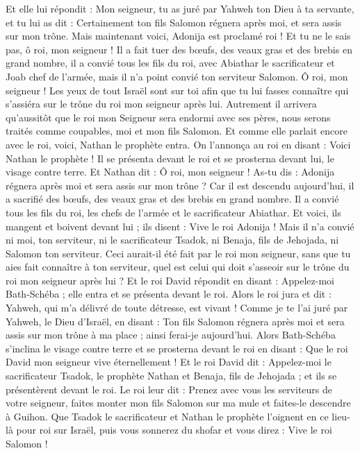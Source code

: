 \begin{multicols}{2}
Et elle lui répondit : Mon seigneur, tu as juré par Yahweh ton Dieu à ta servante, et tu lui as dit : Certainement ton fils Salomon régnera après moi, et sera assis sur mon trône. 
Mais maintenant voici, Adonija est proclamé roi ! Et tu ne le sais pas, ô roi, mon seigneur !
Il a fait tuer des bœufs, des veaux gras et des brebis en grand nombre, il a convié tous les fils du roi, avec Abiathar le sacrificateur et Joab chef de l'armée, mais il n'a point convié ton serviteur Salomon.
Ô roi, mon seigneur ! Les yeux de tout Israël sont sur toi afin que tu lui fasses connaître qui s'assiéra sur le trône du roi mon seigneur après lui.
Autrement il arrivera qu'aussitôt que le roi mon Seigneur sera endormi avec ses pères, nous serons traités comme coupables, moi et mon fils Salomon. 
Et comme elle parlait encore avec le roi, voici, Nathan le prophète entra.
On l'annonça au roi en disant : Voici Nathan le prophète ! Il se présenta devant le roi et se prosterna devant lui, le visage contre terre.
Et Nathan dit : Ô roi, mon seigneur ! As-tu dis : Adonija régnera après moi et sera assis sur mon trône ?
Car il est descendu aujourd'hui, il a sacrifié des bœufs, des veaux gras et des brebis en grand nombre. Il a convié tous les fils du roi, les chefs de l'armée et le sacrificateur Abiathar. Et voici, ils mangent et boivent devant lui ; ils disent : Vive le roi Adonija !
Mais il n'a convié ni moi, ton serviteur, ni le sacrificateur Tsadok, ni Benaja, fils de Jehojada, ni Salomon ton serviteur.
Ceci aurait-il été fait par le roi mon seigneur, sans que tu aies fait connaître à ton serviteur, quel est celui qui doit s'asseoir sur le trône du roi mon seigneur après lui ?
Et le roi David répondit en disant : Appelez-moi Bath-Schéba ; elle entra et se présenta devant le roi.
Alors le roi jura et dit : Yahweh, qui m'a délivré de toute détresse, est vivant !
Comme je te l'ai juré par Yahweh, le Dieu d'Israël, en disant : Ton fils Salomon régnera après moi et sera assis sur mon trône à ma place ; ainsi ferai-je aujourd'hui.
Alors Bath-Schéba s'inclina le visage contre terre et se prosterna devant le roi en disant : Que le roi David mon seigneur vive éternellement !
Et le roi David dit : Appelez-moi le sacrificateur Tsadok, le prophète Nathan et Benaja, fils de Jehojada ; et ils se présentèrent devant le roi.
Le roi leur dit : Prenez avec vous les serviteurs de votre seigneur, faites monter mon fils Salomon sur ma mule et faites-le descendre à Guihon.
Que Tsadok le sacrificateur et Nathan le prophète l'oignent en ce lieu-là pour roi sur Israël, puis vous sonnerez du shofar et vous direz : Vive le roi Salomon !

\end{multicols}
